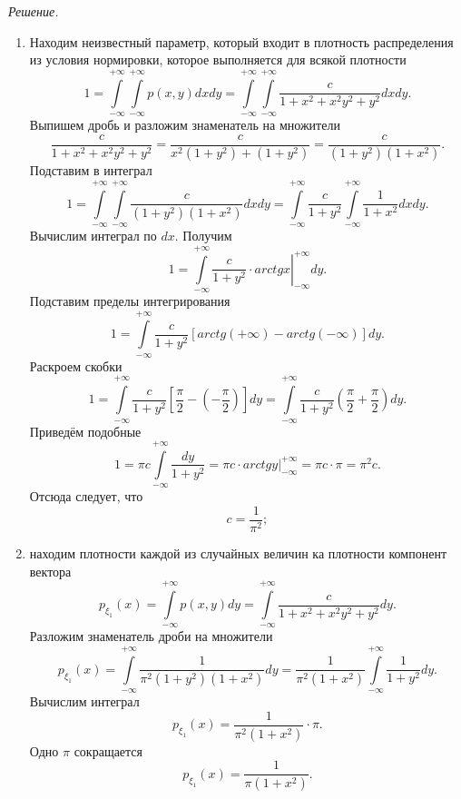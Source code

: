 \textit{Решение.}
\begin{enumerate}[label=\alph*)]
\item Находим неизвестный параметр, который входит в плотность распределения из условия нормировки, которое выполняется для всякой плотности
$$1 =
\int \limits_{- \infty }^{+ \infty } \int \limits_{- \infty }^{+ \infty } p \left( x, y \right) dxdy =
\int \limits_{- \infty }^{+ \infty } \int \limits_{- \infty }^{+ \infty } \frac{c}{1 + x^2 + x^2 y^2 + y^2} dxdy.$$
Выпишем дробь и разложим знаменатель на множители
$$ \frac{c}{1 + x^2 + x^2 y^2 + y^2} =
\frac{c}{x^2 \left( 1 + y^2 \right) + \left( 1 + y^2 \right) } =
\frac{c}{ \left( 1 + y^2 \right) \left( 1 + x^2 \right) }.$$
Подставим в интеграл
$$1 =
\int \limits_{- \infty }^{+ \infty } \int \limits_{- \infty }^{+ \infty } \frac{c}{ \left( 1 + y^2 \right) \left( 1 + x^2 \right) } dxdy =
\int \limits_{- \infty }^{+ \infty } \frac{c}{1 + y^2} \int \limits_{- \infty }^{+ \infty } \frac{1}{1 + x^2} dxdy.$$
Вычислим интеграл по $dx$.
Получим
$$1 =
\int \limits_{- \infty }^{+ \infty } \left. \frac{c}{1 + y^2} \cdot arctg x \right|_{- \infty }^{+ \infty } dy.$$
Подставим пределы интегрирования
$$1 =
\int \limits_{- \infty }^{+ \infty } \frac{c}{1 + y^2} \left[ arctg \left( + \infty \right) - arctg \left( - \infty \right) \right] dy.$$
Раскроем скобки
$$1 =
\int \limits_{- \infty }^{+ \infty } \frac{c}{1 + y^2} \left[ \frac{ \pi }{2} - \left( - \frac{ \pi }{2} \right) \right] dy =
\int \limits_{- \infty }^{+ \infty } \frac{c}{1 + y^2} \left( \frac{ \pi }{2} + \frac{ \pi }{2} \right) dy.$$
Приведём подобные
$$1 =
\pi c \int \limits_{- \infty }^{+ \infty } \frac{dy}{1 + y^2} =
\left. \pi c \cdot arctg y \right|_{- \infty }^{+ \infty } =
\pi c \cdot \pi =
\pi^2 c.$$
Отсюда следует, что
$$c =
\frac{1}{ \pi^2};$$
\item находим плотности каждой из случайных величин ка плотности компонент вектора
$$p_{ \xi_1} \left( x \right) =
\int \limits_{- \infty }^{+ \infty } p \left( x, y \right) dy =
\int \limits_{- \infty }^{+ \infty } \frac{c}{1 + x^2 + x^2 y^2 + y^2} dy.$$
Разложим знаменатель дроби на множители
$$p_{ \xi_1} \left( x \right) =
\int \limits_{- \infty }^{+ \infty } \frac{1}{ \pi^2 \left( 1 + y^2 \right) \left( 1 + x^2 \right) } dy =
\frac{1}{ \pi^2 \left( 1 + x^2 \right) } \int \limits_{- \infty }^{+ \infty } \frac{1}{1 + y^2} dy.$$
Вычислим интеграл
$$p_{ \xi_1} \left( x \right) =
\frac{1}{ \pi^2 \left( 1 + x^2 \right) } \cdot \pi.$$
Одно $ \pi $ сокращается
$$p_{ \xi_1} \left( x \right) =
\frac{1}{ \pi \left( 1 + x^2 \right) }.$$


\end{enumerate}
